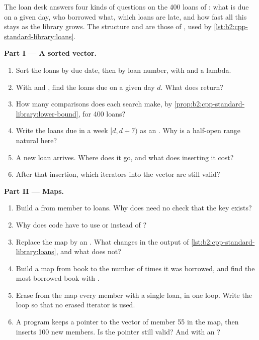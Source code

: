 \begin{problem}\label{pb:b2:cpp-standard-library:1}
The loan desk answers four kinds of questions on the 400 loans of : what is due on a given day, who
borrowed what, which loans are late, and how fast all this stays as the library grows. The  structure and
 are those of , used by \cref{lst:b2:cpp-standard-library:loans}.

\medskip\noindent\textbf{Part I --- A sorted vector.}\par\nopagebreak
\begin{enumerate}[beginpenalty=10000]
\item Sort the loans by due date, then by loan number, with  and a lambda.
\item With  and , find the loans due on a given day $d$. What does
 return?
\item How many comparisons does each search make, by \cref{prop:b2:cpp-standard-library:lower-bound}, for 400 loans?
\item Write the loans due in a week $[d, d + 7)$ as an . Why is a half-open range natural here?
\item A new loan arrives. Where does it go, and what does inserting it cost?
\item After that insertion, which iterators into the vector are still valid?
\end{enumerate}

\medskip\noindent\textbf{Part II --- Maps.}\par\nopagebreak
\begin{enumerate}[resume, beginpenalty=10000]
\item Build a  from member to loans. Why does  need no
check that the key exists?
\item Why does  code have to use  or  instead of ?
\item Replace the map by an . What changes in the output of
\cref{lst:b2:cpp-standard-library:loans}, and what does not?
\item Build a map from book to the number of times it was borrowed, and find the most borrowed book with
.
\item Erase from the map every member with a single loan, in one loop. Write the loop so that no erased iterator is
used.
\item A program keeps a pointer to the vector of member 55 in the map, then inserts 100 new members. Is the pointer
still valid? And with an ?
\end{enumerate}


\end{problem}
